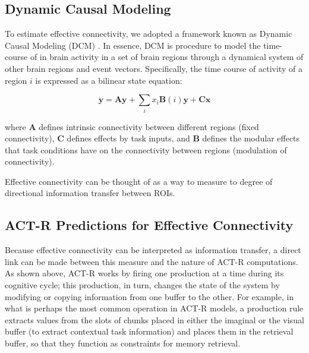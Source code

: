 \documentclass[10pt,letterpaper]{article}
\newcommand{\vct}[1]{\boldsymbol{#1}} %
\newcommand{\mat}[1]{\boldsymbol{#1}} %
\begin{document}
\subsection{Dynamic Causal Modeling}

To estimate effective connectivity, we adopted a framework known as Dynamic Causal Modeling (DCM) \cite{Friston2003, Stocco2018}. In essence, DCM is procedure to model the time-course of in brain activity in a set of brain regions through a dynamical system of other brain regions and event vectors. Specifically, the time course of activity of a region $i$ is expressed as a bilinear state equation:

\begin{equation}
\dot{\vct{y}} = \mat{A}\vct{y} + \sum_{i}x_i\mat{B}(i)\vct{y} + \mat{C}\vct{x}
\label{DCMEquation}
\end{equation}

where $\mat{A}$ defines intrinsic connectivity between different regions (fixed connectivity), $\mat{C}$ defines effects by task inputs, and $\mat{B}$ defines the modular effects that task conditions have on the connectivity between regions (modulation of connectivity). %

Effective connectivity can be thought of as a way to measure to degree of directional information transfer between ROIs.


\subsection{ACT-R Predictions for Effective Connectivity }

Because effective connectivity can be interpreted as information transfer, a direct link can be made between this measure and the nature of ACT-R computations. As shown above, ACT-R works by firing one production at a time during its cognitive cycle; this production, in turn, changes the state of the system by modifying or copying information from one buffer to the other. For example, in what is perhaps the most common operation in ACT-R models, a production rule extracts values from the slots of chunks placed in either the imaginal or the visual buffer (to extract contextual task information) and places them in the retrieval buffer, so that they function as constraints for memory retrieval.  
\end{document}
